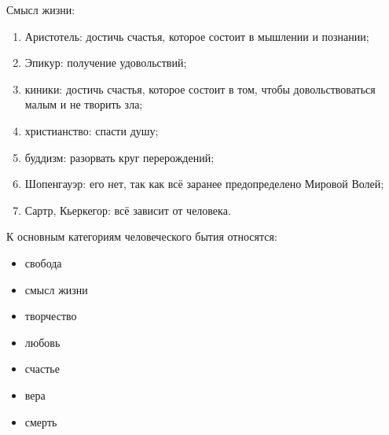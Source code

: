 
Смысл жизни:
\begin{enumerate}
	\item Аристотель: достичь счастья, которое состоит в мышлении и познании;
	\item Эпикур: получение удовольствий;
	\item киники: достичь счастья, которое состоит в том, чтобы довольствоваться малым и не творить зла;
	\item христианство: спасти душу;
	\item буддизм: разорвать круг перерождений;
	\item Шопенгауэр: его нет, так как всё заранее предопределено Мировой Волей;
	\item Сартр, Кьеркегор: всё зависит от человека.
\end{enumerate}

К основным категориям человеческого бытия относятся:
\begin{itemize}
	\item свобода
	\item смысл жизни
	\item творчество  
	\item любовь
	\item счастье 
	\item вера 
	\item смерть
\end{itemize}
